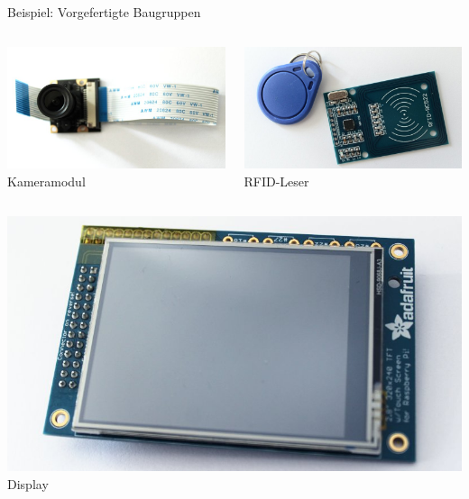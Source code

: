 {
\small

\begin{frame}{Beispiel: Vorgefertigte Baugruppen}
    \begin{columns}
        \includegraphics[width=.8\textwidth]{2-hardwaredesign/img/komponenten_baugruppen_kamera} \\
        Kameramodul

        \includegraphics[width=.8\textwidth]{2-hardwaredesign/img/komponenten_baugruppen_rfid} \\
        RFID-Leser
    \end{columns}

    \bigskip

    \begin{columns}
        \includegraphics[width=.8\textwidth]{2-hardwaredesign/img/komponenten_baugruppen_display} \\
        Display


\end{columns}
\end{frame}}

